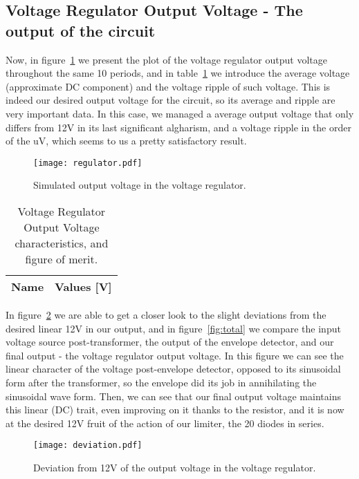 \subsection{Voltage Regulator Output Voltage - The output of the circuit}
Now, in figure~\ref{fig:regulator} we present the plot of the voltage regulator output voltage throughout the same 10 periods, and in table~\ref{tab:result} we introduce the average voltage (approximate DC component) and the voltage ripple of such voltage. This is indeed our desired output voltage for the circuit, so its average and ripple are very important data. In this case, we managed a average output voltage that only differs from 12V in its last significant algharism, and a voltage ripple in the order of the uV, which seems to us a pretty satisfactory result.

\begin{figure}[!h] \centering
\texttt{[image: regulator.pdf]}
\caption{Simulated output voltage in the voltage regulator.}
\label{fig:regulator}
\end{figure}

\begin{table}[h]
  \centering
  \begin{tabular}{|l|r|}
    \hline    
    {\bf Name} & {\bf Values [V]} \\ \hline
     
  \end{tabular}
  \caption{Voltage Regulator Output Voltage characteristics, and figure of merit.}
  \label{tab:result}
\end{table}

In figure~\ref{fig:deviation} we are able to get a closer look to the slight deviations from the desired linear 12V in our output, and in figure~\ref{fig:total} we compare the input voltage source post-transformer, the output of the envelope detector, and our final output - the voltage regulator output voltage. In this figure we can see the linear character of the voltage post-envelope detector, opposed to its sinusoidal form after the transformer, so the envelope did its job in annihilating the sinusoidal wave form. Then, we can see that our final output voltage maintains this linear (DC) trait, even improving on it thanks to the resistor, and it is now at the desired 12V fruit of the action of our limiter, the 20 diodes in series.

\begin{figure}[!h] \centering
\texttt{[image: deviation.pdf]}
\caption{Deviation from 12V of the output voltage in the voltage regulator.}
\label{fig:deviation}
\end{figure}

